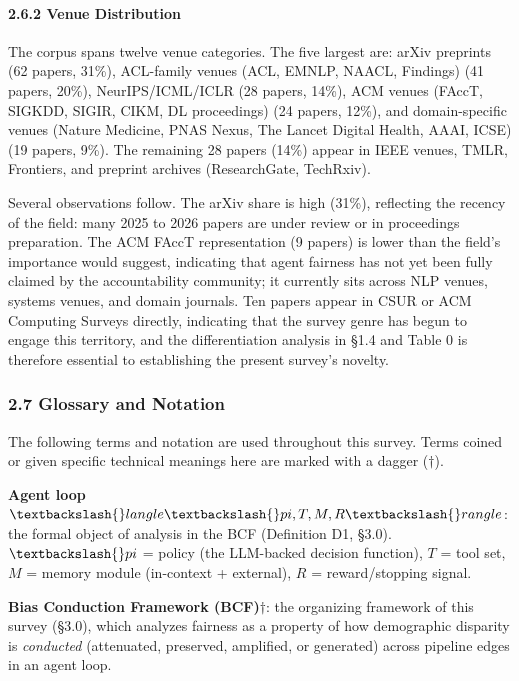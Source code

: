 \documentclass[10pt]{article}
\begin{document}
\paragraph*{2.6.2 Venue Distribution}

The corpus spans twelve venue categories. The five largest are: arXiv preprints (62 papers, 31\%), ACL-family venues (ACL, EMNLP, NAACL, Findings) (41 papers, 20\%), NeurIPS/ICML/ICLR (28 papers, 14\%), ACM venues (FAccT, SIGKDD, SIGIR, CIKM, DL proceedings) (24 papers, 12\%), and domain-specific venues (Nature Medicine, PNAS Nexus, The Lancet Digital Health, AAAI, ICSE) (19 papers, 9\%). The remaining 28 papers (14\%) appear in IEEE venues, TMLR, Frontiers, and preprint archives (ResearchGate, TechRxiv).

Several observations follow. The arXiv share is high (31\%), reflecting the recency of the field: many 2025 to 2026 papers are under review or in proceedings preparation. The ACM FAccT representation (9 papers) is lower than the field's importance would suggest, indicating that agent fairness has not yet been fully claimed by the accountability community; it currently sits across NLP venues, systems venues, and domain journals. Ten papers appear in CSUR or ACM Computing Surveys directly, indicating that the survey genre has begun to engage this territory, and the differentiation analysis in \S{}1.4 and Table 0 is therefore essential to establishing the present survey's novelty.


\subsubsection*{2.7 Glossary and Notation}

The following terms and notation are used throughout this survey. Terms coined or given specific technical meanings here are marked with a dagger ($\dagger$).

\textbf{Agent loop} $\textbackslash\{\}langle \textbackslash\{\}pi, T, M, R \textbackslash\{\}rangle$: the formal object of analysis in the BCF (Definition D1, \S{}3.0). $\textbackslash\{\}pi$ = policy (the LLM-backed decision function), $T$ = tool set, $M$ = memory module (in-context + external), $R$ = reward/stopping signal.

\textbf{Bias Conduction Framework (BCF)$\dagger$}: the organizing framework of this survey (\S{}3.0), which analyzes fairness as a property of how demographic disparity is \emph{conducted} (attenuated, preserved, amplified, or generated) across pipeline edges in an agent loop.
\end{document}
